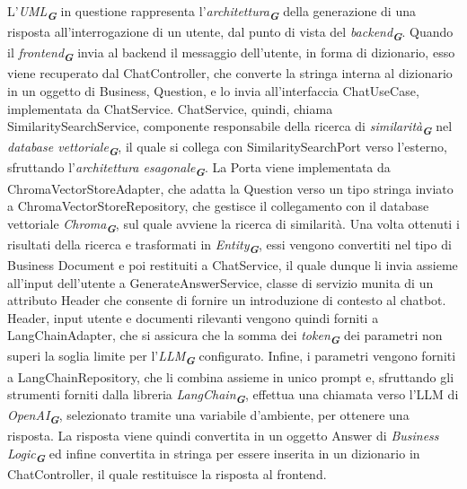 L'\emph{UML}\textsubscript{\textbf{\textit{G}}} in questione rappresenta l'\emph{architettura}\textsubscript{\textbf{\textit{G}}} della generazione di una risposta all'interrogazione di un utente, dal punto di vista del \emph{backend}\textsubscript{\textbf{\textit{G}}}.
Quando il \emph{frontend}\textsubscript{\textbf{\textit{G}}} invia al backend il messaggio dell'utente, in forma di dizionario, esso viene recuperato dal ChatController, che converte la stringa interna al dizionario in un oggetto di Business, Question, e lo invia all'interfaccia ChatUseCase, implementata da ChatService.
ChatService, quindi, chiama SimilaritySearchService, componente responsabile della ricerca di \emph{similarità}\textsubscript{\textbf{\textit{G}}} nel \emph{database vettoriale}\textsubscript{\textbf{\textit{G}}}, il quale si collega con SimilaritySearchPort verso l'esterno, sfruttando l'\emph{architettura esagonale}\textsubscript{\textbf{\textit{G}}}. La Porta viene implementata da ChromaVectorStoreAdapter, che adatta la Question verso un tipo stringa inviato a ChromaVectorStoreRepository, che gestisce il collegamento con il database vettoriale \emph{Chroma}\textsubscript{\textbf{\textit{G}}}, sul quale avviene la ricerca di similarità. Una volta ottenuti i risultati della ricerca e trasformati in \emph{Entity}\textsubscript{\textbf{\textit{G}}}, essi vengono convertiti nel tipo di Business Document e poi restituiti a ChatService, il quale dunque li invia assieme all'input dell'utente a GenerateAnswerService, classe di servizio munita di un attributo Header che consente di fornire un introduzione di contesto al chatbot. Header, input utente e documenti rilevanti vengono quindi forniti a LangChainAdapter, che si assicura che la somma dei \emph{token}\textsubscript{\textbf{\textit{G}}} dei parametri non superi la soglia limite per l'\emph{LLM}\textsubscript{\textbf{\textit{G}}} configurato. Infine, i parametri vengono forniti a LangChainRepository, che li combina assieme in unico prompt e, sfruttando gli strumenti forniti dalla libreria \emph{LangChain}\textsubscript{\textbf{\textit{G}}}, effettua una chiamata verso l'LLM di \emph{OpenAI}\textsubscript{\textbf{\textit{G}}}, selezionato tramite una variabile d'ambiente, per ottenere una risposta. 
La risposta viene quindi convertita in un oggetto Answer di \emph{Business Logic}\textsubscript{\textbf{\textit{G}}} ed infine convertita in stringa per essere inserita in un dizionario in ChatController, il quale restituisce la risposta al frontend.

\newpage


